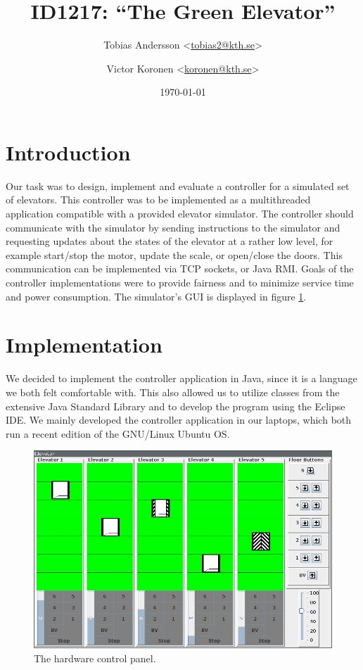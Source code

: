\documentclass[a4paper]{article}
\title{ID1217: ``The Green Elevator''}
\author{%
    Tobias Andersson <\href{mailto:tobias2@kth.se}{tobias2@kth.se}> \and
    Victor Koronen <\href{mailto:koronen@kth.se}{koronen@kth.se}>
}
\date{\today}
\begin{document}
\maketitle
\thispagestyle{empty}

\section{Introduction}

Our task was to design, implement and evaluate a controller for a simulated set
of elevators. This controller was to be implemented as a multithreaded application compatible with a provided elevator simulator. The controller should communicate with the simulator by sending instructions to the simulator and requesting updates about the states of the elevator at a rather low level, for example start/stop the motor, update the scale, or open/close the doors. This communication can be implemented via TCP sockets, or Java RMI. Goals of the controller implementations were to provide fairness and to minimize service time and power consumption. The simulator's GUI is displayed in figure \ref{fig:hardware_control_panel}.

\section{Implementation}

We decided to implement the controller application in Java, since it is a
language we both felt comfortable with. This also allowed us to utilize classes
from the extensive Java Standard Library and to develop the program using the
Eclipse IDE. We mainly developed the controller application in our laptops,
which both run a recent edition of the GNU/Linux Ubuntu OS.

\begin{figure}[h!]
    \centering
    \includegraphics[width=1.0\textwidth]{images/elevators_5_6.png}
    \caption{The hardware control panel.}
    \label{fig:hardware_control_panel}
\end{figure}
\end{document}
